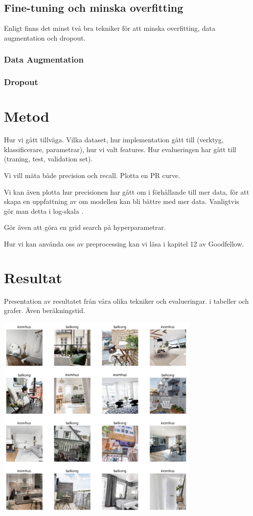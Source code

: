 \documentclass{kththesis}
\begin{document}
  \section{Fine-tuning och minska overfitting}
  Enligt \cite{krizhevsky_imagenet_2012} finns det minst två bra tekniker för att minska overfitting, data augmentation och dropout.

    \subsection{Data Augmentation}

    \subsection{Dropout}

\chapter{Metod}
Hur vi gått tillväga. Vilka dataset, hur implementation gått till (verktyg, klassificerare, parametrar), hur vi valt features.
Hur evalueringen har gått till (traning, test, validation set).

Vi vill mäta både precision och recall. Plotta en PR curve.

Vi kan även plotta hur precisionen har gått om i förhållande till mer data, för att skapa en uppfattning av om modellen kan bli bättre med mer data. Vanligtvis gör man detta i log-skala \parencite{Goodfellow-et-al-2016}. 

Gör även att göra en grid search på hyperparametrar.

Hur vi kan använda oss av preprocessing kan vi  läsa i kapitel 12 av Goodfellow.

\chapter{Resultat}
Presentation av resultatet från våra olika tekniker och evalueringar. i tabeller och grafer. Även beräkningstid. 

\includegraphics[width=10cm]{../images/1.png}
\end{document}
